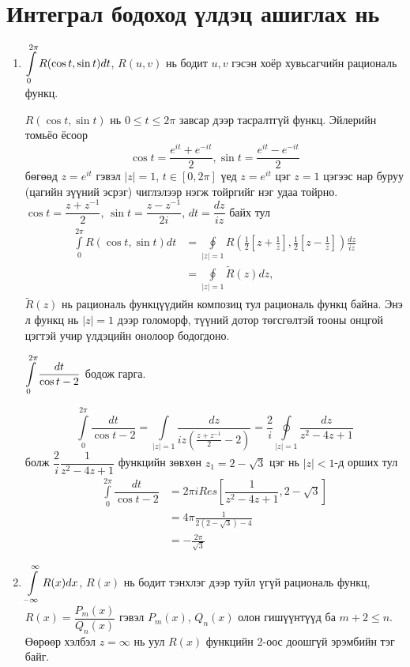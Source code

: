 \section{Интеграл бодоход үлдэц ашиглах нь}
\begin{enumerate}
    \item [\textbf{I.}] $\displaystyle\int\limits_0^{2\pi} R(\cos t,\sin t)dt$, $R(u,v)$ нь бодит $u,v$ гэсэн хоёр хувьсагчийн рациональ функц.
    
    
$R(\cos t, \sin t)$ нь $0\leq t\leq 2\pi$ завсар дээр тасралтгүй функц.
Эйлерийн томьёо ёсоор
$$\cos t=\frac{e^{it}+e^{-it}}{2}, \sin t=\frac{e^{it}-e^{-it}}{2}$$
бөгөөд $z=e^{it}$ гэвэл $|z|=1$, $t\in[0,2\pi]$ үед $z=e^{it}$ цэг $z=1$ цэгээс нар буруу (цагийн зүүний эсрэг) чиглэлээр нэгж тойргийг нэг удаа тойрно. $\cos t=\dfrac{z+z^{-1}}{2}$, $\sin t=\dfrac{z-z^{-1}}{2i}$, $dt=\dfrac{dz}{iz}$ байх тул 
\begin{eqnarray}
\begin{split}
    \int\limits_0^{2\pi}R(\cos t,\sin t)dt&=\oint\limits_{|z|=1}R\left(\frac{1}{2}\left[z+\frac{1}{z}\right], \frac{1}{2}\left[z-\frac{1}{z}\right]\right)\frac{dz}{iz} \\
    &=\oint\limits_{|z|=1} \tilde{R}(z)dz,
\end{split}
\end{eqnarray}
$\tilde{R}(z)$ нь рациональ функцүүдийн композиц тул рациональ функц байна. Энэ л функц нь $|z|=1$ дээр голоморф, түүний дотор төгсгөлтэй тооны онцгой цэгтэй учир үлдэцийн онолоор бодогдоно.
\begin{exm}
$\displaystyle\int\limits_{0}^{2\pi} \dfrac{dt}{\cos t-2}$ бодож гарга.
\end{exm}
\begin{sol}
$$\int\limits_{0}^{2\pi} \dfrac{dt}{\cos t-2} =\int\limits_{|z|=1} \dfrac{dz}{iz\left(\frac{z+z^{-1}}{2}-2\right)}=\frac{2}{i}\oint\limits_{|z|=1}\frac{dz}{z^2-4z+1}$$ болж $\dfrac{2}{i}\dfrac{1}{z^2-4z+1}$ функцийн зөвхөн $z_1=2-\sqrt{3}$ цэг нь $|z|<1$-д орших тул 
\begin{align*}
    \int\limits_{0}^{2\pi} \dfrac{dt}{\cos t-2}& =2\pi i Res\left[ \dfrac{1}{z^2-4z+1}, 2-\sqrt{3}\right] \\
    &=4 \pi \frac{1}{2(2-\sqrt{3})-4} \\
    &=-\frac{2\pi}{\sqrt{3}}
\end{align*}

\end{sol}
\item[\textbf{II.}]
$\displaystyle\int \limits_{-\infty}^\infty R(x)dx$, $R(x)$ нь бодит тэнхлэг дээр туйл үгүй рациональ функц, $R(x)=\dfrac{P_m(x)}{Q_n(x)}$ гэвэл $P_m(x)$, $Q_n(x)$ олон гишүүнтүүд ба $m+2\leq n$. Өөрөөр хэлбэл $z=\infty $ нь уул $R(x)$ функцийн 2-оос доошгүй эрэмбийн тэг байг.


\end{enumerate}
